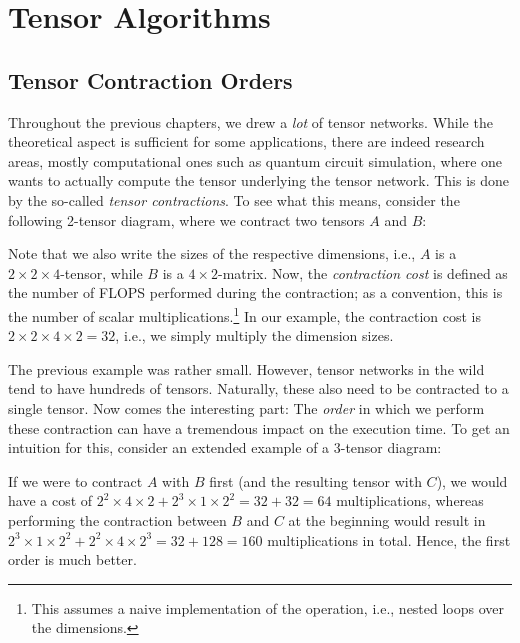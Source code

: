 
\chapter{Tensor Algorithms}

\section{Tensor Contraction Orders}\label{sec:opt_contr}

Throughout the previous chapters, we drew a \emph{lot} of tensor networks. While the theoretical aspect is sufficient for some applications, there are indeed research areas, mostly computational ones such as quantum circuit simulation, where one wants to actually compute the tensor underlying the tensor network.
This is done by the so-called \emph{tensor contractions}.
To see what this means, consider the following 2-tensor diagram, where we contract two tensors $A$ and $B$:
\begin{center}
    \resizebox{0.44\textwidth}{!}{
        
    }
\end{center}
Note that we also write the sizes of the respective dimensions, i.e., $A$ is a $2\times 2\times 4$-tensor, while $B$ is a $4 \times 2$-matrix.
Now, the \emph{contraction cost} is defined as the number of FLOPS performed during the contraction; as a convention, this is the number of scalar multiplications.\footnote{This assumes a naive implementation of the operation, i.e., nested loops over the dimensions.}
In our example, the contraction cost is $2 \times 2 \times 4 \times 2 = 32$, i.e., we simply multiply the dimension sizes.

The previous example was rather small.
However, tensor networks in the wild tend to have hundreds of tensors.
Naturally, these also need to be contracted to a single tensor.
Now comes the interesting part: The \emph{order} in which we perform these contraction can have a tremendous impact on the execution time.
To get an intuition for this, consider an extended example of a 3-tensor diagram:
\begin{center}
    \resizebox{0.35\textwidth}{!}{
        
    }
\end{center}
If we were to contract $A$ with $B$ first (and the resulting tensor with $C$), we would have a cost of $2^2 \times 4\times 2 + 2^3 \times 1 \times 2^2 = 32 + 32 = 64$ multiplications, whereas performing the contraction between $B$ and $C$ at the beginning would result in $2^3 \times 1 \times 2^2 + 2^2 \times 4 \times 2^3 = 32 + 128 = 160$ multiplications in total. Hence, the first order is much better.

